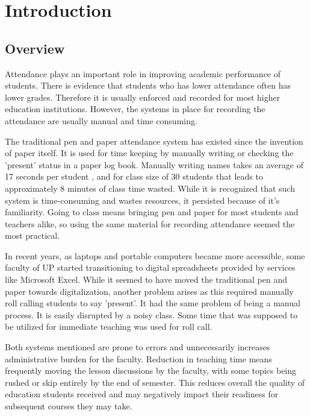 \chapter{Introduction}
\label{sec:researchdesc}    %

\section{Overview}
\label{sec:overview}

Attendance plays an important role in improving academic performance of students. There is evidence that students who has lower attendance often has lower grades\cite{EJES3887}. Therefore it is usually enforced and recorded for most higher education institutions. However, the systems in place for recording the attendance are usually manual and time consuming.

The traditional pen and paper attendance system has existed since the invention of paper itself. It is used for time keeping by manually writing or checking the 'present' status in a paper log book. Manually writing names takes an average of 17 seconds per student \cite{shoewu:2014}, and for class size of 30 students that leads to approximately 8 minutes of class time wasted. While it is recognized that such system is time-consuming and wastes resources, it persisted because of it's familiarity. Going to class means bringing pen and paper for most students and teachers alike, so using the same material for recording attendance seemed the most practical.

In recent years, as laptops and portable computers became more accessible, some faculty of UP started transitioning to digital spreadsheets provided by services like Microsoft Excel. While it seemed to have moved the traditional pen and paper towards digitalization, another problem arises as this required manually roll calling students to say 'present'. It had the same problem of being a manual process. It is easily disrupted by a noisy class. Some time that was supposed to be utilized for immediate teaching was used for roll call.

Both systems mentioned are prone to errors and unnecessarily increases administrative burden for the faculty. Reduction in teaching time means frequently moving the lesson discussions by the faculty, with some topics being rushed or skip entirely by the end of semester. This reduces overall the quality of education students received and may negatively impact their readiness for subsequent courses they may take. 

